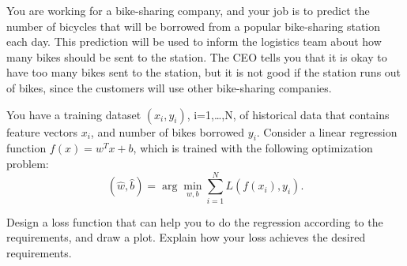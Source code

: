 You are working for a bike-sharing company, and your job is to predict the number of bicycles that will be borrowed from a popular bike-sharing station each day. This prediction will be used to inform the logistics team about how many bikes should be sent to the station. The CEO tells you that it is okay to have too many bikes sent to the station, but it is not good if the station runs out of bikes, since the customers will use other bike-sharing companies.


You have a training dataset \((x_i,y_i)\), i=1,…,N, of historical data that contains feature vectors \(x_i\), and number of bikes borrowed \(y_i\). Consider a linear regression function \(f(x)=w^Tx+b\), which is trained with the following optimization problem:
\[
(\hat w,\hat b)=\arg\min_{w,b}\sum_{i=1}^N L(f(x_i),y_i).
\]


Design a loss function that can help you to do the regression according to the requirements, and draw a plot. Explain how your loss achieves the desired requirements.
